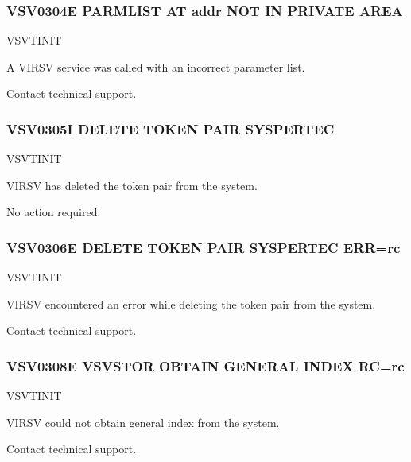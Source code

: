 \documentclass[letterpaper,10pt,english]{sphinxmanual}
\begin{document}
\subsubsection{VSV0304E PARMLIST AT addr NOT IN PRIVATE AREA}
\label{\detokenize{messages:vsv0304e-parmlist-at-addr-not-in-private-area}}\begin{description}
\sphinxAtStartPar
VSVTINIT

\sphinxAtStartPar
A VIRSV service was called with an incorrect parameter list.

\sphinxAtStartPar
Contact technical support.

\end{description}


\subsubsection{VSV0305I DELETE TOKEN PAIR SYSPERTEC}
\label{\detokenize{messages:vsv0305i-delete-token-pair-syspertec}}\begin{description}
\sphinxAtStartPar
VSVTINIT

\sphinxAtStartPar
VIRSV has deleted the token pair from the system.

\sphinxAtStartPar
No action required.

\end{description}


\subsubsection{VSV0306E DELETE TOKEN PAIR SYSPERTEC ERR=rc}
\label{\detokenize{messages:vsv0306e-delete-token-pair-syspertec-err-rc}}\begin{description}
\sphinxAtStartPar
VSVTINIT

\sphinxAtStartPar
VIRSV encountered an error while deleting the token pair from the system.

\sphinxAtStartPar
Contact technical support.

\end{description}


\subsubsection{VSV0308E VSVSTOR OBTAIN GENERAL INDEX RC=rc}
\label{\detokenize{messages:vsv0308e-vsvstor-obtain-general-index-rc-rc}}\begin{description}
\sphinxAtStartPar
VSVTINIT

\sphinxAtStartPar
VIRSV could not obtain general index from the system.

\sphinxAtStartPar
Contact technical support.

\end{description}
\end{document}

